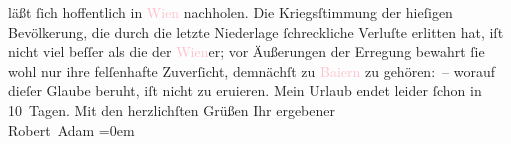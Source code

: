                läßt ſich hoffentlich in \textcolor{pink}{Wien}{}\ledrightnote{\textcolor{pink}{Wien}} nachholen.\pend
           \pstart
           Die Kriegsſtimmung der hieſigen Bevölkerung, die durch die letzte Niederlage
               ſchreckliche Verluſte erlitten hat, iſt nicht viel beſſer als die der \textcolor{pink}{Wien}{}\ledrightnote{\textcolor{pink}{Wien}}er; vor Äußerungen der Erregung bewahrt ſie wohl nur ihre
               felſenhafte Zuverſicht, demnächſt zu \textcolor{pink}{Baiern}{}\ledrightnote{\textcolor{pink}{Bayern}} zu
               gehören: – worauf dieſer Glaube beruht, iſt nicht zu eruieren.\pend
           \pstart
           Mein Urlaub endet leider ſchon in 10 Tagen.\pend
           \pstart
           Mit den herzlichſten Grüßen\pend
           \pstart
           Ihr ergebener{\\[\baselineskip]}\spacefill\mbox{Robert Adam}\pend
           \leftskip=0em{}\endnumbering{}  
      